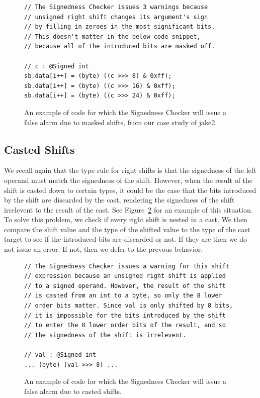 \begin{figure}
\begin{lstlisting}
// The Signedness Checker issues 3 warnings because
// unsigned right shift changes its argument's sign
// by filling in zeroes in the most significant bits.
// This doesn't matter in the below code snippet,
// because all of the introduced bits are masked off.

// c : @Signed int
sb.data[i++] = (byte) ((c >>> 8) & 0xff);
sb.data[i++] = (byte) ((c >>> 16) & 0xff);
sb.data[i++] = (byte) ((c >>> 24) & 0xff);

\end{lstlisting}
\caption{An example of code for which the Signedness Checker will issue a false
alarm due to masked shifts, from our case study of jake2.}
\label{fig:maskedshift}
\end{figure}

\subsection{Casted Shifts}
We recall again that the type rule for right shifts is that the signedness
of the left
operand must match the signedness of the shift. However, when the result of the
shift is casted down to certain types, it could be the case that the bits
introduced by the shift are discarded by the cast, rendering the signedness of
the shift irrelevent to the result of the cast.
See Figure~\ref{fig:castedshift} for an example of this situation. To solve this
problem, we check if every right shift is nested in a cast. We then compare the
shift value and the type of the shifted value to the type of the cast target
to see if the introduced bits are discarded or not. If they are then we do not
issue an error. If not, then we defer to the prevous behavior.

\begin{figure}
\begin{lstlisting}
// The Signedness Checker issues a warning for this shift
// expression because an unsigned right shift is applied
// to a signed operand. However, the result of the shift
// is casted from an int to a byte, so only the 8 lower
// order bits matter. Since val is only shifted by 8 bits,
// it is impossible for the bits introduced by the shift
// to enter the 8 lower order bits of the result, and so
// the signedness of the shift is irrelevent.

// val : @Signed int
... (byte) (val >>> 8) ...
\end{lstlisting}
\caption{An example of code for which the Signedness Checker will issue a false
alarm due to casted shifts.}
\label{fig:castedshift}
\end{figure}

